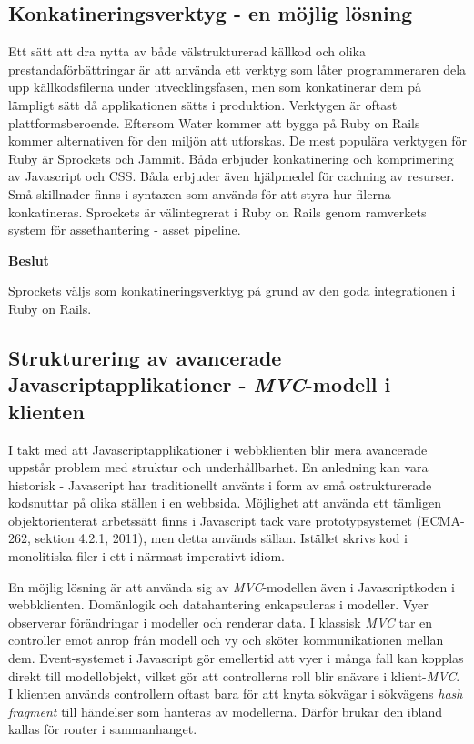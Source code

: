 \subsection{Konkatineringsverktyg - en möjlig lösning}
Ett sätt att dra nytta av både välstrukturerad källkod och olika prestandaförbättringar är att använda ett verktyg som låter programmeraren dela upp källkodsfilerna under utvecklingsfasen, men som konkatinerar dem på lämpligt sätt då applikationen sätts i produktion. 
Verktygen är oftast plattformsberoende. Eftersom Water kommer att bygga på Ruby on Rails kommer alternativen för den miljön att utforskas. 
De mest populära verktygen för Ruby är Sprockets och Jammit. Båda erbjuder konkatinering och komprimering av Javascript och CSS. Båda erbjuder även hjälpmedel för cachning av resurser. Små skillnader finns i syntaxen som används för att styra hur filerna konkatineras.
Sprockets är välintegrerat i Ruby on Rails genom ramverkets system för assethantering - asset pipeline.

\begin{flushright}
  
  \textbf{Beslut}
  
  Sprockets väljs som konkatineringsverktyg på grund av den goda integrationen i Ruby on Rails.
  
\end{flushright}

\subsection{Strukturering av avancerade Javascriptapplikationer - \emph{MVC}-modell i klienten}
I takt med att Javascriptapplikationer i webbklienten blir mera avancerade uppstår problem med struktur och underhållbarhet. En anledning kan vara historisk - Javascript har traditionellt använts i form av små ostrukturerade kodsnuttar på olika ställen i en webbsida. Möjlighet att använda ett tämligen objektorienterat arbetssätt finns i Javascript tack vare prototypsystemet (ECMA-262, sektion 4.2.1, 2011), men detta används sällan. Istället skrivs kod i monolitiska filer i ett i närmast imperativt idiom.

En möjlig lösning är att använda sig av \emph{MVC}-modellen även i Javascriptkoden i webbklienten. Domänlogik och datahantering enkapsuleras i modeller. Vyer observerar förändringar i modeller och renderar data. I klassisk \emph{MVC} tar en controller emot anrop från modell och vy och sköter kommunikationen mellan dem. Event-systemet i Javascript gör emellertid att vyer i många fall kan kopplas direkt till modellobjekt, vilket gör att controllerns roll blir snävare i klient-\emph{MVC}. I klienten används controllern oftast bara för att knyta sökvägar i sökvägens \emph{hash fragment} till händelser som hanteras av modellerna. Därför brukar den ibland kallas för router i sammanhanget.

